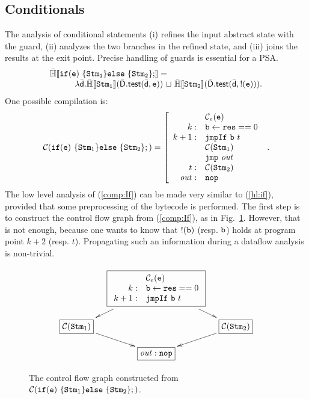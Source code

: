 \documentclass{llncs}
\begin{document}
\subsection{Conditionals}
The analysis of conditional statements (i) refines the input abstract
state with the guard, (ii) analyzes the two branches in the refined
state, and (iii) joins the results at the exit point.  Precise
handling of guards is essential for a PSA.
\begin{equation}
  \begin{array}{l}
    \HLSem{ \If(\code{e})~ \{ \Stm_1 \} \Else~\{ \Stm_2 \};} =  \\
    \quad \quad \quad \lambda \ael{d}. \HLSem{\Stm_1}(\adom{D}.\atest(\ael{d}, \code{e}))\ \acup\ \HLSem{\Stm_2}(\adom{D}.\atest(\ael{d}, \code{!(e)})).
  \end{array}
  \label{hl:if}
\end{equation}
One possible compilation is:
\begin{equation}
  \mathcal{C}( \mathtt{if}(\mathtt{e})~ \{ \mathtt{Stm}_1 \} \mathtt{else}~\{ \mathtt{Stm}_2 \}; ) = 
  \left [ 
    \begin{array}{r l}
      & \mathcal{C}_{e}(\mathtt{e}) \\
      k :& \mathtt{b} \leftarrow \mathtt{res} == 0 \\
      k+1 :& \mathtt{jmpIf}\ \mathtt{b}\  t \\
      & \mathcal{C}(\mathtt{Stm}_1) \\
      & \mathtt{jmp}\ \mathit{out} \\
      t: & \mathcal{C}(\mathtt{Stm}_2)\\
      \mathit{out}: &\mathtt{nop}
    \end{array}
  \right. \ .
\label{comp:If}
\end{equation}
The low level analysis of (\ref{comp:If}) can be made very similar to
(\ref{hl:if}), provided that some preprocessing of the bytecode is
performed.  The first step is to construct the control flow graph from
(\ref{comp:If}), as in Fig.~\ref{fig:cfgIf}.  However, that is not
enough, because one wants to know that $!(\mathtt{b})$
(resp. $\mathtt{b}$) holds at program point $k+2$ (resp. $t$).
Propagating such an information during a dataflow analysis is
non-trivial.

\begin{figure}[t]
  \[
  \xymatrix @-1.2pc {
    & \fbox{$\begin{array}{rl}&\Compexp(\code{e}) \\  k:& \code{b} \takes \result == 0 \\ k+1 :& \JumpIfTrue\ \code{b}\  t  \end{array}$} \ar[dr] \ar[dl] \\
    \fbox{$\Comp(\Stm_1)$} \ar[dr]&  &\fbox{$\Comp(\Stm_2)$}\ar[dl]  \\
    &\fbox{$\mathit{out}: \Nop$} &
  }
  \]
  \caption{The control flow graph constructed from $\mathcal{C}( \mathtt{if}(\mathtt{e})~ \{ \mathtt{Stm}_1 \} \mathtt{else}~\{ \mathtt{Stm}_2 \}; )$.}
  \label{fig:cfgIf}
\end{figure}
\end{document}
